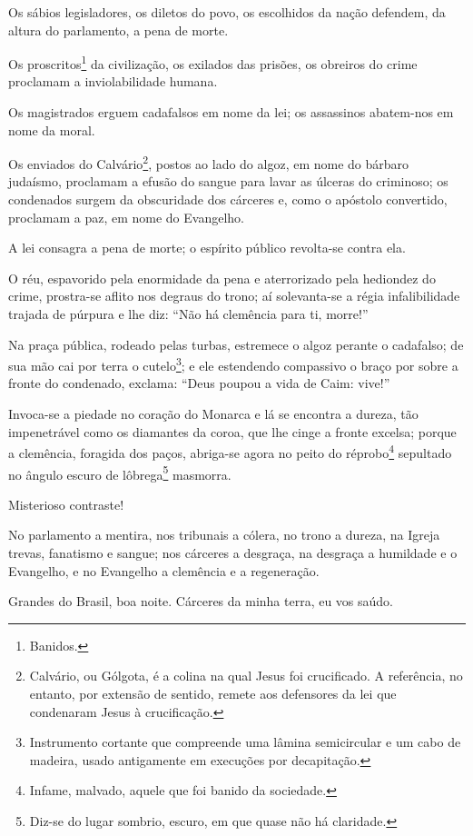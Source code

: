 Os sábios legisladores, os diletos do povo, os escolhidos da nação
defendem, da altura do parlamento, a pena de morte.

Os proscritos\footnote{Banidos.} da civilização, os exilados das
prisões, os obreiros do crime proclamam a inviolabilidade humana.

Os magistrados erguem cadafalsos em nome da lei; os assassinos
abatem-nos em nome da moral.

Os enviados do Calvário\footnote{Calvário, ou Gólgota, é a colina na
  qual Jesus foi crucificado. A referência, no entanto, por extensão de
  sentido, remete aos defensores da lei que condenaram Jesus à
  crucificação.}, postos ao lado do algoz, em nome do bárbaro judaísmo,
proclamam a efusão do sangue para lavar as úlceras do criminoso; os
condenados surgem da obscuridade dos cárceres e, como o apóstolo
convertido, proclamam a paz, em nome do Evangelho.

A lei consagra a pena de morte; o espírito público revolta-se contra
ela.

O réu, espavorido pela enormidade da pena e aterrorizado pela hediondez
do crime, prostra-se aflito nos degraus do trono; aí solevanta-se a
régia infalibilidade trajada de púrpura e lhe diz: ``Não há clemência
para ti, morre!''

Na praça pública, rodeado pelas turbas, estremece o algoz perante o
cadafalso; de sua mão cai por terra o cutelo\footnote{Instrumento
  cortante que compreende uma lâmina semicircular e um cabo de madeira,
  usado antigamente em execuções por decapitação.}; e ele estendendo
compassivo o braço por sobre a fronte do condenado, exclama: ``Deus
poupou a vida de Caim: vive!''

Invoca-se a piedade no coração do Monarca e lá se encontra a dureza, tão
impenetrável como os diamantes da coroa, que lhe cinge a fronte excelsa;
porque a clemência, foragida dos paços, abriga-se agora no peito do
réprobo\footnote{Infame, malvado, aquele que foi banido da sociedade.}
sepultado no ângulo escuro de lôbrega\footnote{Diz-se do lugar
  sombrio, escuro, em que quase não há claridade.} masmorra.

Misterioso contraste!

No parlamento a mentira, nos tribunais a cólera, no trono a dureza, na
Igreja trevas, fanatismo e sangue; nos cárceres a desgraça, na desgraça
a humildade e o Evangelho, e no Evangelho a clemência e a regeneração.

Grandes do Brasil, boa noite. Cárceres da minha terra, eu vos saúdo.

